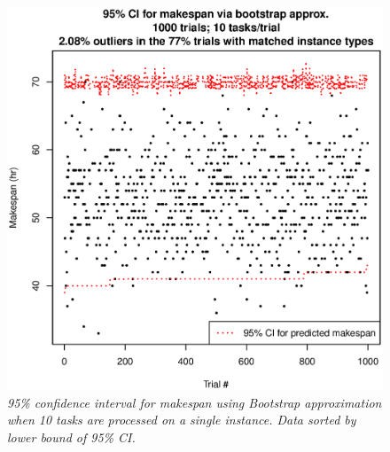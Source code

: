 \documentclass[12pt]{report}
\begin{document}
\begin{figure}
\includegraphics[width=1\textwidth]{validate-stochastic-runtimes-1000-trials-10-tasks.eps}
\caption{\textit{95\% confidence interval for makespan using Bootstrap approximation when 10 tasks are processed on a single instance. Data sorted by lower bound of 95\% CI.}}
\label{fig:validate-stochastic-runtimes-1000-trials-10-tasks}
\end{figure}
\end{document}
